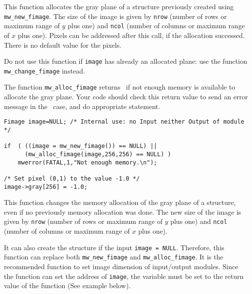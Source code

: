 \Description
This function allocates the gray plane of a \fimage structure previously
created using \verb+mw_new_fimage+. The size of the image is given by 
\verb+nrow+ (number of rows or maximum range of $y$ plus one) and \verb+ncol+
(number of columns or maximum range of $x$ plus one).
Pixels can be addressed after this call, if the allocation successed. There is
no default value for the pixels.

Do not use this function if \verb+image+ has already an allocated plane: use
the function \verb+mw_change_fimage+ instead.

The function \verb+mw_alloc_fimage+ returns \Null\ if not enough memory is available to allocate the gray plane. Your code should check this return value to 
send an error message in the \Null\ case, and do appropriate statement.

\Next
\Example
\begin{verbatim}
Fimage image=NULL; /* Internal use: no Input neither Output of module */

if  ( ((image = mw_new_fimage()) == NULL) ||
      (mw_alloc_fimage(image,256,256) == NULL) )
    mwerror(FATAL,1,"Not enough memory.\n");

/* Set pixel (0,1) to the value -1.0 */
image->gray[256] = -1.0;

\end{verbatim}

\newpage %

\Description
This function changes the memory allocation of the gray plane of a \fimage
structure, even if no previously memory allocation was done.
The new size of the image is given by \verb+nrow+ (number of rows or maximum 
range of $y$ plus one) and \verb+ncol+ (number of columns or maximum range of 
$x$ plus one). 

It can also create the structure if the input \verb+image = NULL+.
Therefore, this function can replace both \verb+mw_new_fimage+ and
\verb+mw_alloc_fimage+. It is the recommended function to set image 
dimension of input/output modules. Since the function can set the 
address of \verb+image+, the variable must be set to the return value of 
the function (See example below).

